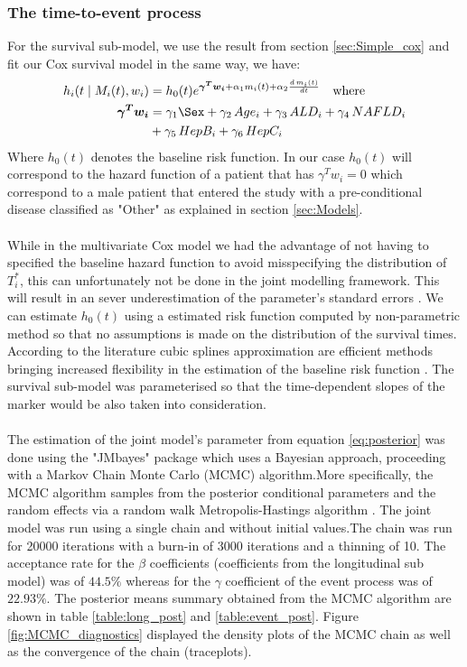 \documentclass[11pt,twoside]{article}
\numberwithin{Theorem}{section}
\numberwithin{Definition}{section}
\numberwithin{Lemma}{section}
\numberwithin{Algorithm}{section}
\numberwithin{equation}{section}
\begin{document}
  \subsubsection{The time-to-event process}
  For the survival sub-model, we use the result from section \ref{sec:Simple_cox} and fit our Cox survival model in the same way, we have:
  \begin{align}
     h_i(t \mid M_i(t),w_i)&=h_0(t) e^{\boldsymbol{\gamma^{T}w_i}+\alpha_1 m_i(t)+ \alpha_2 \frac{d \, m_i(t)}{dt}} \quad \text{where} \\
     \boldsymbol{\gamma^{T} w_i}&=\gamma_1 \Sex + \gamma_2 \, Age_i +\gamma_3 \, ALD_i +\gamma_4 \, NAFLD_i \\
     &+\gamma_5 \, HepB_i +\gamma_6 \, HepC_i
  \end{align}
 Where $h_0(t)$ denotes the baseline risk function. In our case $h_0(t)$ will correspond to the hazard function of a patient that has $\gamma^T w_i=0$ which correspond to a male patient that entered the study with a pre-conditional disease classified as "Other" as explained in section \ref{sec:Models}. \\ \\
 While in the multivariate Cox model we had the advantage of not having to specified the baseline hazard function to avoid misspecifying the distribution of $T_i^*$, this can unfortunately not be done in the joint modelling framework. This will result in an sever underestimation of the parameter's standard errors \cite{hsieh2006joint}. We can estimate $h_0(t)$ using a estimated risk function computed by non-parametric method so that no assumptions is made on the distribution of the survival times. According to the literature cubic splines approximation are efficient methods bringing increased flexibility in the estimation of the baseline risk function \cite{harrell1984regression}.
 The survival sub-model was parameterised so that the time-dependent slopes of the marker would be also taken into consideration. \\ \\
 The estimation of the joint model's parameter from equation \ref{eq:posterior} was done using the "JMbayes" package which uses a Bayesian approach, proceeding with a Markov Chain Monte Carlo (MCMC) algorithm.More specifically, the MCMC algorithm samples from the posterior conditional parameters and the random effects via a random walk Metropolis-Hastings algorithm \cite{rizopoulos2014r}. The joint model was run using a single chain and without initial values.The chain was run for 20000 iterations with a burn-in of 3000 iterations and a thinning of 10. The acceptance rate for the $\beta$ coefficients (coefficients from the longitudinal sub model) was of $44.5\%$ whereas for the $\gamma$ coefficient of the event process was of $22.93 \%$. The posterior means summary obtained from the MCMC algorithm are shown in table \ref{table:long_post} and \ref{table:event_post}. Figure \ref{fig:MCMC_diagnostics} displayed the density plots of the MCMC chain as well as the convergence of the chain (traceplots).
\end{document}
